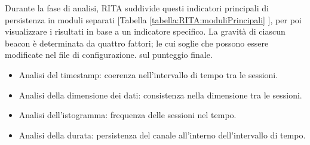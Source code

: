 





Durante la fase di analisi, RITA suddivide questi indicatori principali di persistenza in moduli separati [Tabella \ref{tabella:RITA:moduliPrincipali} ], 
per poi visualizzare i risultati in base a un indicatore specifico. 
La gravità di ciascun beacon 
è determinata da quattro fattori; 
le cui soglie che possono essere modificate nel file di configurazione. %
sul punteggio finale.
\begin{itemize}
    \item Analisi del timestamp: coerenza nell'intervallo di tempo tra le sessioni. 
    \item Analisi della dimensione dei dati: consistenza nella dimensione tra le sessioni. 
    \item Analisi dell'istogramma: frequenza delle sessioni nel tempo. 
    \item Analisi della durata: persistenza del canale all'interno dell'intervallo di tempo. 
\end{itemize}  
